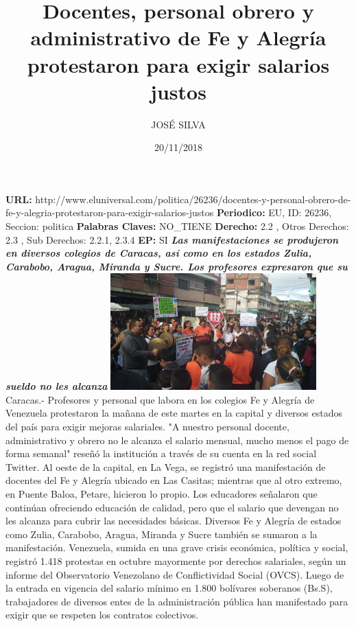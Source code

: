 \documentclass{article}%
\title{\textbf{Docentes, personal obrero y administrativo de Fe y Alegría protestaron para exigir salarios justos}}%
\author{JOSÉ SILVA}%
\date{20/11/2018}%
\begin{document}
%
\normalsize%
\maketitle%
\textbf{URL: }%
http://www.eluniversal.com/politica/26236/docentes{-}y{-}personal{-}obrero{-}de{-}fe{-}y{-}alegria{-}protestaron{-}para{-}exigir{-}salarios{-}justos\newline%
%
\textbf{Periodico: }%
EU, %
ID: %
26236, %
Seccion: %
politica\newline%
%
\textbf{Palabras Claves: }%
NO\_TIENE\newline%
%
\textbf{Derecho: }%
2.2%
, Otros Derechos: %
2.3%
, Sub Derechos: %
2.2.1, 2.3.4%
\newline%
%
\textbf{EP: }%
SI\newline%
\newline%
%
\textbf{\textit{Las manifestaciones se produjeron en diversos colegios de Caracas, así como en los estados Zulia, Carabobo, Aragua, Miranda y Sucre. Los profesores expresaron que su sueldo no les alcanza}}%
\newline%
\newline%
%
\includegraphics[width=300px]{110.jpg}%
\newline%
%
Caracas.{-} Profesores y personal que labora en los colegios Fe y Alegría de Venezuela protestaron la mañana de este martes en la capital y diversos estados del país para exigir mejoras salariales.%
\newline%
%
"A nuestro personal docente, administrativo y obrero no le alcanza el salario mensual, mucho menos el pago de forma semanal" reseñó la institución a través de su cuenta en la red social Twitter.%
\newline%
%
Al oeste de la capital, en La Vega, se registró una manifestación de docentes del Fe y Alegría ubicado en Las Casitas; mientras que al otro extremo, en Puente Baloa, Petare, hicieron lo propio.%
\newline%
%
Los educadores señalaron que continúan ofreciendo educación de calidad, pero que el salario que devengan no les alcanza para cubrir las necesidades básicas.%
\newline%
%
Diversos Fe y Alegría de estados como Zulia, Carabobo, Aragua, Miranda y Sucre también se sumaron a la manifestación.%
\newline%
%
Venezuela, sumida en una grave crisis económica, política y social, registró 1.418 protestas en octubre mayormente por derechos salariales, según un informe del Observatorio Venezolano de Conflictividad Social (OVCS).%
\newline%
%
Luego de la entrada en vigencia del salario mínimo en 1.800 bolívares soberanos (Bs.S), trabajadores de diversos entes de la administración pública han manifestado para exigir que se respeten los contratos colectivos.%
\newline%
%
\end{document}
